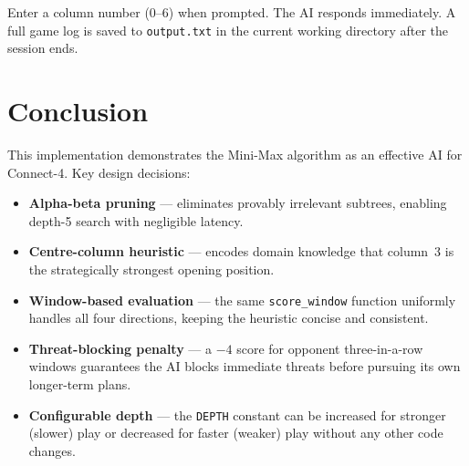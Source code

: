 \documentclass[12pt]{article}
\begin{document}
Enter a column number (0--6) when prompted.  The AI responds immediately.
A full game log is saved to \texttt{output.txt} in the current working
directory after the session ends.

\section{Conclusion}

This implementation demonstrates the Mini-Max algorithm as an effective AI
for Connect-4.  Key design decisions:

\begin{itemize}
    \item \textbf{Alpha-beta pruning} --- eliminates provably irrelevant
          subtrees, enabling depth-5 search with negligible latency.
    \item \textbf{Centre-column heuristic} --- encodes domain knowledge that
          column~3 is the strategically strongest opening position.
    \item \textbf{Window-based evaluation} --- the same \texttt{score\_window}
          function uniformly handles all four directions, keeping the
          heuristic concise and consistent.
    \item \textbf{Threat-blocking penalty} --- a $-4$ score for opponent
          three-in-a-row windows guarantees the AI blocks immediate threats
          before pursuing its own longer-term plans.
    \item \textbf{Configurable depth} --- the \texttt{DEPTH} constant can be
          increased for stronger (slower) play or decreased for faster
          (weaker) play without any other code changes.
\end{itemize}
\end{document}
